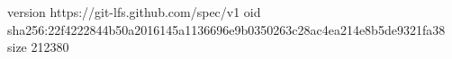 version https://git-lfs.github.com/spec/v1
oid sha256:22f4222844b50a2016145a1136696e9b0350263c28ac4ea214e8b5de9321fa38
size 212380
